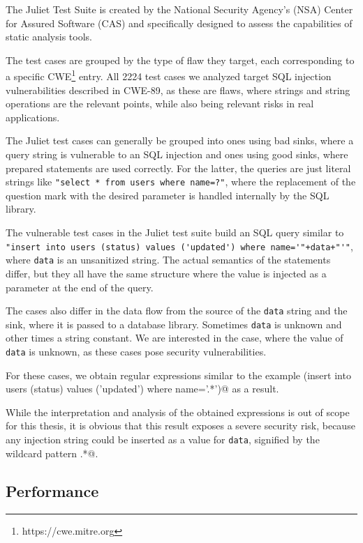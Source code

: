 The Juliet Test Suite is created by the National Security Agency’s (NSA) Center for Assured Software (CAS) and specifically designed to assess the capabilities of static analysis tools.

The test cases are grouped by the type of flaw they target, each corresponding to a specific CWE\footnote{https://cwe.mitre.org} entry. All 2224 test cases we analyzed target SQL injection vulnerabilities described in CWE-89, as these are flaws, where strings and string operations are the relevant points, while also being relevant risks in real applications.

The Juliet test cases can generally be grouped into ones using bad sinks, where a query string is vulnerable to an SQL injection and ones using good sinks, where prepared statements are used correctly. For the latter, the queries are just literal strings like \lstinline|"select * from users where name=?"|, where the replacement of the question mark with the desired parameter is handled internally by the SQL library.

The vulnerable test cases in the Juliet test suite build an SQL query similar to \lstinline|"insert into users (status) values ('updated') where name='"+data+"'"|, where \lstinline|data| is an unsanitized string. The actual semantics of the statements differ, but they all have the same structure where the value is injected as a parameter at the end of the query.

The cases also differ in the data flow from the source of the \lstinline|data| string and the sink, where it is passed to a database library. Sometimes \lstinline|data| is unknown and other times a string constant. We are interested in the case, where the value of \lstinline|data| is unknown, as these cases pose security vulnerabilities.

For these cases, we obtain regular expressions similar to the example \Verb@(insert into users (status) values ('updated') where name='.*')@ as a result.

While the interpretation and analysis of the obtained expressions is out of scope for this thesis, it is obvious that this result exposes a severe security risk, because any injection string could be inserted as a value for \lstinline|data|, signified by the wildcard pattern \Verb@.*@.

\subsection{Performance}\label{sec:eval:peformance}

